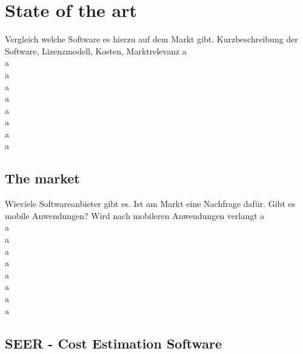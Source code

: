 \section{State of the art}

Vergleich welche Software es hierzu auf dem Markt gibt. Kurzbeschreibung der Software, Lizenzmodell, Kosten, Marktrelevanz
a\\
a\\
a\\
a\\
a\\
a\\
a\\
a\\
a

\subsection{The market}

Wieviele Softwareanbieter gibt es. Ist am Markt eine Nachfrage dafür. Gibt es mobile Anwendungen? Wird nach mobileren Anwendungen verlangt
a\\
a\\
a\\
a\\
a\\
a\\
a\\
a\\
a
\subsection{SEER - Cost Estimation Software}

